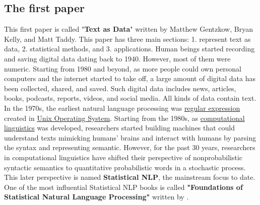 \documentclass[aoas]{imsart}
\numberwithin{equation}{section}
\theoremstyle{plain}
\theoremstyle{remark}
\begin{document}
\subsection{The first paper}
This first paper is called "\textbf{Text as Data}" \cite{10.1257/jel.20181020} written by Matthew Gentzkow, Bryan Kelly, and Matt Taddy. This paper has three main sections: 1. represent text as data, 2. statistical methods, and 3. applications. Human beings started recording and saving digital data dating back to 1940. However, most of them were numeric. Starting from 1980 and beyond, as more people could own personal computers and the internet started to take off, a large amount of digital data has been collected, shared, and saved. Such digital data includes news, articles, books, podcasts, reports, videos, and social media. All kinds of data contain text. In the 1970s, the earliest natural language processing was  \href{https://www.google.com/search?q=regular+expression&sca_esv=596374102&ei=YMOaZbTULdyfqtsP6Y-2kAM&ved=0ahUKEwi0hOz9y8uDAxXcj2oFHemHDTIQ4dUDCBA&oq=regular+expression&gs_lp=Egxnd3Mtd2l6LXNlcnAiEnJlZ3VsYXIgZXhwcmVzc2lvbkgAUABYAHAAeAGQAQCYAQCgAQCqAQC4AQzIAQDiAwQYACBB&sclient=gws-wiz-serp}{regular expression} created in \href{https://www.hpc.iastate.edu/guides/unix-introduction#:~:text=What%20is%20UNIX%3F,for%20servers%2C%20desktops%20and%20laptops.}{Unix Operating System}. Starting from the 1980s, as \href{https://plato.stanford.edu/entries/computational-linguistics/#IntGoaMetComLin}{computational linguistics} was developed, researchers started building machines that could understand texts mimicking humans' brains and interact with humans by parsing the syntax and representing semantic. However, for the past 30 years, researchers in computational linguistics have shifted their perspective of nonprobabilistic syntactic semantics to quantitative probabilistic words in a stochastic process. This later perspective is named \textbf{Statistical NLP}, the mainstream focus to date. One of the most influential Statistical NLP books is called \textbf{"Foundations of Statistical Natural Language Processing"} written by \cite{manning99foundations}.
\end{document}
